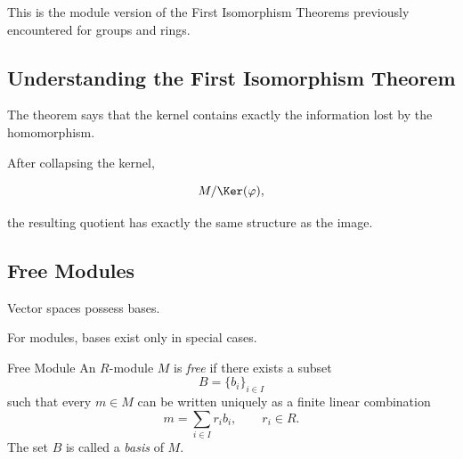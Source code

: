 This is the module version of the First Isomorphism Theorems previously
encountered for groups and rings.

\subsection{Understanding the First Isomorphism Theorem}
\label{subsec:understanding-first-module-isomorphism}

The theorem says that the kernel contains exactly the information lost by the
homomorphism.

After collapsing the kernel,

\[ M/\Ker(\varphi), \]

the resulting quotient has exactly the same structure as the image.

\begin{center}
\end{center}

\subsection{Free Modules}
\label{subsec:free-modules}

Vector spaces possess bases.

For modules, bases exist only in special cases.

\begin{definitionbox}{Free Module}
An \(R\)-module \(M\) is \emph{free} if there exists a subset
\[ B=\{b_i\}_{i\in I} \]
such that every \(m\in M\) can be written uniquely as a finite linear
combination
\[ m=\sum_{i\in I}r_ib_i,\qquad r_i\in R. \]
The set \(B\) is called a \emph{basis} of \(M\).
\end{definitionbox}

